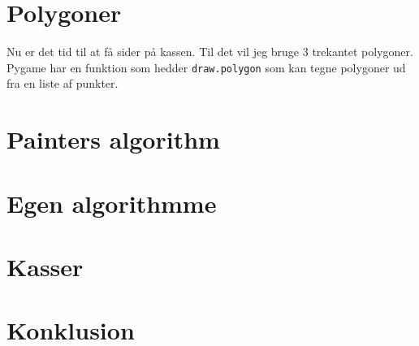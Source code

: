 \documentclass{article}
\begin{document}
\section{Polygoner}
Nu er det tid til at få sider på kassen. Til det vil jeg bruge 3 trekantet polygoner. 
Pygame har en funktion som hedder \texttt{draw.polygon} som kan tegne polygoner ud fra en liste af punkter.


\section{Painters algorithm}

\section{Egen algorithmme}

\section{Kasser}

\section{Konklusion}
\end{document}
